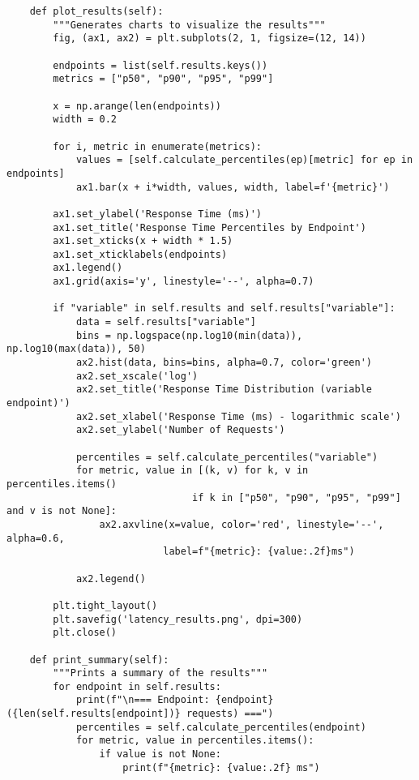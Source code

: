 \documentclass[12pt,letterpaper]{article}
\newenvironment{macterminal}{%
    \begin{mdframed}[
        linecolor=terminalFrame,
        backgroundcolor=terminalBg,
        roundcorner=5pt,
        skipabove=10pt,
        skipbelow=10pt,
        linewidth=1pt,
        innertopmargin=10pt, %
        frametitle={%
            \tikz[baseline=(current bounding box.east), outer sep=0pt]{
                \fill[red!80!black] (0,0) circle (5pt);
                \fill[yellow!80!black] (0.7,0) circle (5pt);
                \fill[green!70!black] (1.4,0) circle (5pt);
            }
        },
        frametitlealignment=\raggedright, %
        frametitleaboveskip=8pt, %
        frametitlebelowskip=0pt, %
    ]
}{%
    \end{mdframed}%
}
\begin{document}
\begin{macterminal}
\begin{lstlisting}
    def plot_results(self):
        """Generates charts to visualize the results"""
        fig, (ax1, ax2) = plt.subplots(2, 1, figsize=(12, 14))
        
        endpoints = list(self.results.keys())
        metrics = ["p50", "p90", "p95", "p99"]
        
        x = np.arange(len(endpoints))
        width = 0.2
        
        for i, metric in enumerate(metrics):
            values = [self.calculate_percentiles(ep)[metric] for ep in endpoints]
            ax1.bar(x + i*width, values, width, label=f'{metric}')
        
        ax1.set_ylabel('Response Time (ms)')
        ax1.set_title('Response Time Percentiles by Endpoint')
        ax1.set_xticks(x + width * 1.5)
        ax1.set_xticklabels(endpoints)
        ax1.legend()
        ax1.grid(axis='y', linestyle='--', alpha=0.7)
        
        if "variable" in self.results and self.results["variable"]:
            data = self.results["variable"]
            bins = np.logspace(np.log10(min(data)), np.log10(max(data)), 50)
            ax2.hist(data, bins=bins, alpha=0.7, color='green')
            ax2.set_xscale('log')
            ax2.set_title('Response Time Distribution (variable endpoint)')
            ax2.set_xlabel('Response Time (ms) - logarithmic scale')
            ax2.set_ylabel('Number of Requests')
            
            percentiles = self.calculate_percentiles("variable")
            for metric, value in [(k, v) for k, v in percentiles.items() 
                                if k in ["p50", "p90", "p95", "p99"] and v is not None]:
                ax2.axvline(x=value, color='red', linestyle='--', alpha=0.6, 
                           label=f"{metric}: {value:.2f}ms")
            
            ax2.legend()
        
        plt.tight_layout()
        plt.savefig('latency_results.png', dpi=300)
        plt.close()
    
    def print_summary(self):
        """Prints a summary of the results"""
        for endpoint in self.results:
            print(f"\n=== Endpoint: {endpoint} ({len(self.results[endpoint])} requests) ===")
            percentiles = self.calculate_percentiles(endpoint)
            for metric, value in percentiles.items():
                if value is not None:
                    print(f"{metric}: {value:.2f} ms")


\end{lstlisting}
\end{macterminal}
\end{document}
